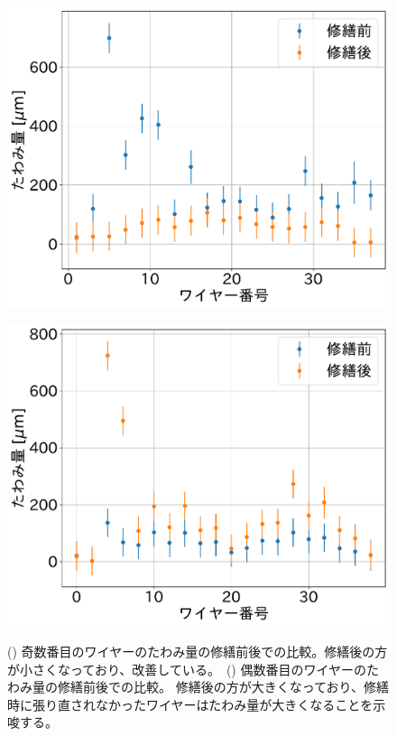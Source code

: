 \documentclass[../../main.tex]{subfiles}
\begin{document}
\begin{figure}[H]
    \begin{minipage}[b]{0.5\hsize}
        \centering
        \includegraphics[width=1.0\textwidth]{wiresag_swg/swg_sag_odd_comparison.pdf}
        \subcaption{}
        \label{fig:wiresag_swg_sag_odd_comparison}
    \end{minipage}
    \begin{minipage}[b]{0.5\hsize}
        \centering
        \includegraphics[width=1.0\textwidth]{wiresag_swg/swg_sag_even_comparison.pdf}
        \subcaption{}
        \label{fig:wiresag_swg_sag_even_comparison}
    \end{minipage}
    \caption{() 奇数番目のワイヤーのたわみ量の修繕前後での比較。修繕後の方が小さくなっており、改善している。\ 
             () 偶数番目のワイヤーのたわみ量の修繕前後での比較。
             修繕後の方が大きくなっており、修繕時に張り直されなかったワイヤーはたわみ量が大きくなることを示唆する。
             }
    \label{fig:wiresag_swg_even_odd_repair_comparison}
\end{figure}
\end{document}
